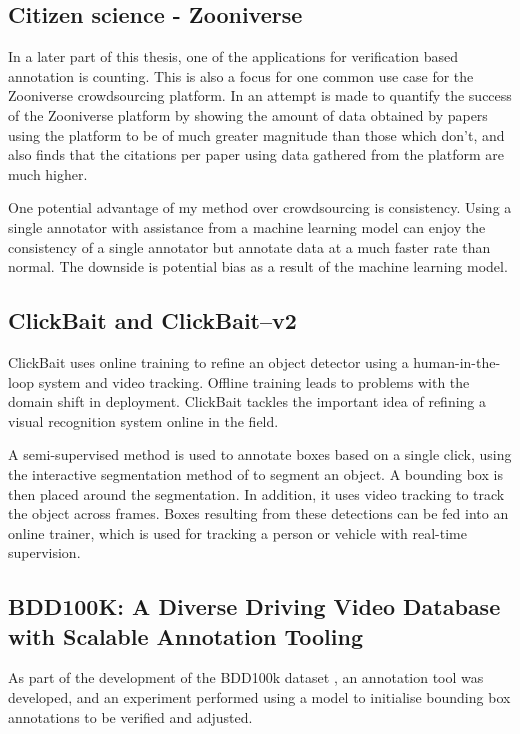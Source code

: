 \subsection{Citizen science - Zooniverse \texorpdfstring{\cite{Zooniverse}}{}}

In a later part of this thesis, one of the applications for verification based annotation is counting. This is also a focus for one common use case for the Zooniverse crowdsourcing platform. In \cite{Watson2018} an attempt is made to quantify the success of the Zooniverse platform by showing the amount of data obtained by papers using the platform to be of much greater magnitude than those which don't, and also finds that the citations per paper using data gathered from the platform are much higher. 

One potential advantage of my method over crowdsourcing is consistency. Using a single annotator with assistance from a machine learning model can enjoy the consistency of a single annotator but annotate data at a much faster rate than normal. The downside is potential bias as a result of the machine learning model.

\subsection{ClickBait and ClickBait--v2 \texorpdfstring{\cite{Teng2017, Teng2018}}{}}

ClickBait uses online training to refine an object detector using a human-in-the-loop system and video tracking. Offline training leads to problems with the domain shift in deployment. ClickBait tackles the important idea of refining a visual recognition system online in the field.

A semi-supervised method is used to annotate boxes based on a single click, using the interactive segmentation method of \cite{Xu2016} to segment an object. A bounding box is then placed around the segmentation. In addition, it uses video tracking to track the object across frames. Boxes resulting from these detections can be fed into an online trainer, which is used for tracking a person or vehicle with real-time supervision.


\subsection{BDD100K: A Diverse Driving Video Database with
Scalable Annotation Tooling \texorpdfstring{\cite{Yu2018a} }{}}

As part of the development of the BDD100k dataset \cite{Yu2018a}, an annotation tool was developed, and an experiment performed using a model to initialise bounding box annotations to be verified and adjusted. 

